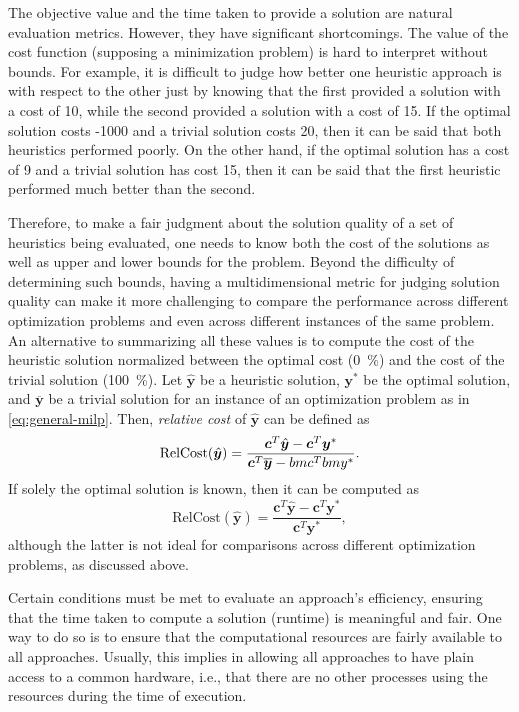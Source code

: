 The objective value and the time taken to provide a solution are natural evaluation metrics.
However, they have significant shortcomings.
The value of the cost function (supposing a minimization problem) is hard to interpret without bounds.
For example, it is difficult to judge how better one heuristic approach is with respect to the other just by knowing that the first provided a solution with a cost of 10, while the second provided a solution with a cost of 15.
If the optimal solution costs -1000 and a trivial solution costs 20, then it can be said that both heuristics performed poorly.
On the other hand, if the optimal solution has a cost of 9 and a trivial solution has cost 15, then it can be said that the first heuristic performed much better than the second.

Therefore, to make a fair judgment about the solution quality of a set of heuristics being evaluated, one needs to know both the cost of the solutions as well as upper and lower bounds for the problem.
Beyond the difficulty of determining such bounds, having a multidimensional metric for judging solution quality can make it more challenging to compare the performance across different optimization problems and even across different instances of the same problem.
An alternative to summarizing all these values is to compute the cost of the heuristic solution normalized between the optimal cost (0~\%) and the cost of the trivial solution (100~\%).
Let $\hat{\bm{y}}$ be a heuristic solution, $\bm{y}^*$ be the optimal solution, and $\overline{\bm{y}}$ be a trivial solution for an instance of an optimization problem as in \eqref{eq:general-milp}.
Then, \emph{relative cost} of $\hat{\bm{y}}$ can be defined as
\begin{equation}
    \text{RelCost}(\hat{\bm{y}}) = \frac{\bm{c}^{T} \hat{\bm{y}} - \bm{c}^{T} \bm{y}^*}{\bm{c}^{T}\overline{\bm{y}} - \\bm{c}^{T}bm{y}^*}
.\end{equation}
If solely the optimal solution is known, then it can be computed as
\begin{equation}
    \text{RelCost}(\hat{\bm{y}}) = \frac{\bm{c}^{T} \hat{\bm{y}} - \bm{c}^{T} \bm{y}^*}{\bm{c}^{T}\bm{y}^*}
,\end{equation}
although the latter is not ideal for comparisons across different optimization problems, as discussed above.

Certain conditions must be met to evaluate an approach's efficiency, ensuring that the time taken to compute a solution (runtime) is meaningful and fair.
One way to do so is to ensure that the computational resources are fairly available to all approaches.
Usually, this implies in allowing all approaches to have plain access to a common hardware, i.e., that there are no other processes using the resources during the time of execution.

